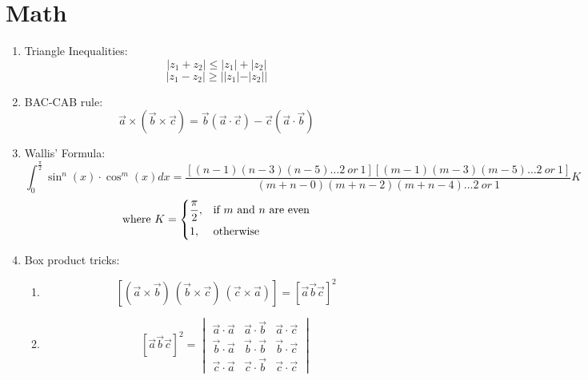 \documentclass{article}
\numberwithin{equation}{section}
\numberwithin{figure}{section}
\newcommand{\Cr}{\times}
\begin{document}
\section{Math}
\begin{enumerate}
	\item Triangle Inequalities:
\begin{equation}
	|z_1+z_2|\leq|z_1|+|z_2|
\end{equation}
\begin{equation}
	|z_1-z_2|\geq ||z_1|-|z_2||
\end{equation}
	\item BAC-CAB rule:
\begin{equation}
	\vec{a}\Cr(\vec{b}\Cr\vec{c})=\vec{b}(\vec{a}\cdot\vec{c})-\vec{c}(\vec{a}\cdot\vec{b})
\end{equation}
	\item Wallis' Formula:
\begin{equation}
	\int_{0}^{\frac{\pi}{2}} \sin^{n}(x)\cdot \cos^{m}(x)dx=\frac{[(n-1)(n-3)(n-5)\dots 2\ or \ 1][(m-1)(m-3)(m-5)\dots 2 \ or \ 1 ]}{(m+n-0)(m+n-2)(m+n-4)\dots 2 \ or \ 1} K
\end{equation}
\begin{equation*}
	\text{where }    K= 
	\begin{dcases}
		\frac{\pi}{2} ,& \text{if }  m \text{ and } n \text{ are even}\\
		        1,              & \text{otherwise}
	\end{dcases}
\end{equation*}			
	\item Box product tricks:
		\begin{enumerate}
			\item \begin{equation}\left[(\vec{a}\Cr \vec{b}) \  (\vec{b}\Cr \vec{c}) \ (\vec{c}\Cr\vec{a})\right]=\left[\vec{a} \vec{b} \vec{c}\right]^2\end{equation}
			\item 
				\begin{equation}
					\left[\vec{a} \vec{b} \vec{c}\right]^2=
					\begin{vmatrix}
						\vec{a}\cdot\vec{a} & \vec{a}\cdot \vec{b} & \vec{a}\cdot\vec{c}\\
						\vec{b}\cdot\vec{a} & \vec{b}\cdot\vec{b} & \vec{b}\cdot\vec{c}\\
						\vec{c}\cdot\vec{a} & \vec{c}\cdot\vec{b} & \vec{c}\cdot\vec{c}
					\end{vmatrix}
				\end{equation}

\end{enumerate}
\end{enumerate}
\end{document}
